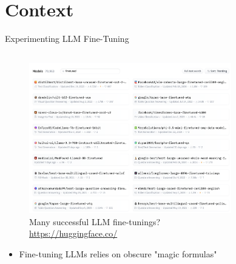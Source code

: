 \documentclass[11pt,aspectratio=169]{beamer}
\begin{document}
\section{Context}

\begin{frame}{Experimenting LLM Fine-Tuning}
    \begin{columns}
        \renewcommand{\thempfootnote}{}
        \begin{column}{0.5\linewidth}
            \vspace{-0.5cm}
            \begin{figure}
                \centering
                \caption*{\centering Many successful LLM fine-tunings?\\{\footnotesize\url{https://huggingface.co/}}}
                \vspace{-0.3cm}
                \includegraphics[width=0.9\textwidth]{finetune_success.png}
            \end{figure}
            \vspace{-0.3cm}
            \begin{itemize}
                \item<3-> Fine-tuning LLMs relies on obscure "magic formulas"
            \end{itemize}
        \end{column}
        \begin{column}{0.5\linewidth}
            \vspace{-0.8cm}
            \begin{figure}
\end{figure}
\end{column}
\end{columns}
\end{frame}
\end{document}
